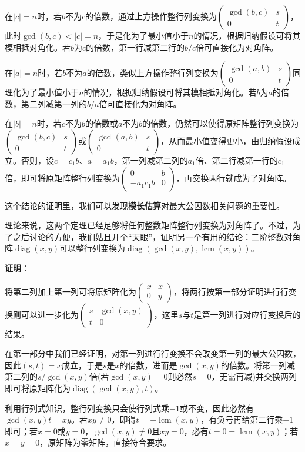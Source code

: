 \documentclass[a4paper,UTF8,fontset=windows,AutoFakeBold]{ctexart}
\DeclareMathOperator{\diag}{diag}
\DeclareMathOperator{\lcm}{lcm}
\newcommand*{\note}{\noindent *}
\newcommand{\proo}[1]{{\vspace{5pt}\kaishu\noindent\textbf{证明}：\vspace{-3pt}
\begin{compactitem}
    \item[] #1
\end{compactitem}
}}
\begin{document}
\begin{enumerate}
\begin{itemize}
        在$|c|=n$时，若$b$不为$c$的倍数，通过上方操作整行列变换为$\begin{pmatrix}\gcd(b,c)&s\\0&t\end{pmatrix}$，此时$\gcd(b,c)<|c|=n$，于是化为了最小值小于$n$的情况，根据归纳假设可将其模相抵对角化。若$b$为$c$的倍数，第一行减第二行的$b/c$倍可直接化为对角阵。

        在$|a|=n$时，若$b$不为$a$的倍数，类似上方操作整行列变换为$\begin{pmatrix}\gcd(a,b)&s\\0&t\end{pmatrix}$同理化为了最小值小于$n$的情况，根据归纳假设可将其模相抵对角化。若$b$为$a$的倍数，第二列减第一列的$b/a$倍可直接化为对角阵。

        在$|b|=n$时，若$c$不为$b$的倍数或$a$不为$b$的倍数，仍然可以使得原矩阵整行列变换为$\begin{pmatrix}\gcd(b,c)&s\\0&t\end{pmatrix}$或$\begin{pmatrix}\gcd(a,b)&s\\0&t\end{pmatrix}$，从而最小值变得更小，由归纳假设成立。否则，设$c=c_1b$、$a=a_1b$，第一列减第二列的$a_1$倍、第二行减第一行的$c_1$倍，即可将原矩阵整行列变换为$\begin{pmatrix}0&b\\-a_1c_1b&0\end{pmatrix}$，再交换两行就成为了对角阵。
    \end{itemize}

    \note 这个结论的证明里，我们可以发现\textbf{模长估算}对最大公因数相关问题的重要性。
\end{enumerate}

理论来说，这两个定理已经足够将任何整数矩阵整行列变换为对角阵了。不过，为了之后讨论的方便，我们姑且开个``天眼''，证明另一个有用的结论：二阶整数对角阵$\diag(x,y)$可以整行列变换为$\diag(\gcd(x,y),\lcm(x,y))$。

\proo{
    将第二列加上第一列可将原矩阵化为$\begin{pmatrix}x&x\\0&y\end{pmatrix}$，将两行按第一部分证明进行行变换则可以进一步化为$\begin{pmatrix}s&\gcd(x,y)\\t&0\end{pmatrix}$，这里$s$与$t$是第一列进行对应行变换后的结果。

    在第一部分中我们已经证明，对第一列进行行变换不会改变第一列的最大公因数，因此$(s,t)=x$成立，于是$s$是$x$的倍数，进而是$\gcd(x,y)$的倍数。将第一列减第二列的$s/\gcd(x,y)$倍(若$\gcd(x,y)=0$则必然$s=0$，无需再减)并交换两列即可将原矩阵化为$\diag(\gcd(x,y),t)$。

    利用行列式知识，整行列变换只会使行列式乘$-1$或不变，因此必然有$\gcd(x,y)t=xy$。若$xy\ne0$，即得$t=\pm\lcm(x,y)$，有负号再给第二行乘$-1$即可；若$x=0$或$y=0$，$\gcd(x,y)\ne0$且$xy=0$，必有$t=0=\lcm(x,y)$；若$x=y=0$，原矩阵为零矩阵，直接符合要求。
}
\end{document}
